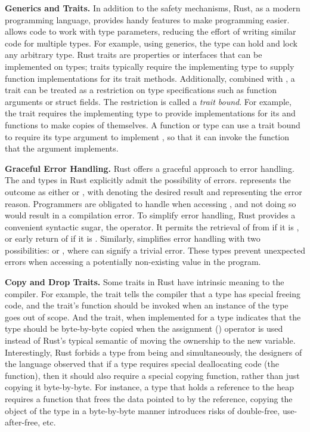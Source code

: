 \textbf{Generics and Traits.}
In addition to the safety mechanisms, Rust, as a modern programming language,
provides handy features to make programming easier.
 allows code to work with type parameters,
reducing the effort of writing similar code for multiple types.
For example, using generics, the  type can
hold and lock any arbitrary type.
Rust traits are properties or interfaces that can be implemented on types; traits typically require the implementing type
to supply function implementations for its trait methods.
Additionally, combined with ,
a trait can be treated as a restriction on type specifications such as function arguments or struct fields.
The restriction is called a \textit{trait bound}.
For example, the  trait requires the implementing type
to provide implementations for its  and  functions
to make copies of themselves.
A  function or type can use a trait bound to
require its type argument to implement ,
so that it can invoke the  function that the argument implements.

\textbf{Graceful Error Handling.}
Rust offers a graceful approach to error handling.
The  and  types in Rust
explicitly admit the possibility of errors.
 represents the outcome as either  or ,
with  denoting the desired result
and  representing the error reason.
Programmers are obligated to handle  when accessing ,
and not doing so would result in a compilation error.
To simplify error handling,
Rust provides a convenient syntactic sugar,
the  operator.
It permits the retrieval of  from  if it is ,
or early return of  if it is .
Similarly,  simplifies error handling with two possibilities:
 or , where  can signify a trivial error.
These types prevent unexpected errors
when accessing a potentially non-existing value in the program.

\textbf{Copy and Drop Traits.}
Some traits in Rust have intrinsic meaning to the compiler. For example, the
 trait tells the compiler that a type has special freeing code, and
the  trait's  function should be invoked when an instance
of the type goes out of scope. And the  trait, when implemented for
a type indicates that the type should be byte-by-byte copied when the
assignment (\code{=}) operator is used instead of Rust's typical semantic
of moving the ownership to the new variable. Interestingly, Rust forbids a type
from being  and  simultaneously, the designers of the
language observed that if a type requires special deallocating code (the
 function), then it should also require a special copying function,
rather than just copying it byte-by-byte. For instance, a type that holds a
reference to the heap requires a  function that frees the data
pointed to by the reference, copying the object of the type in a byte-by-byte
manner introduces risks of double-free, use-after-free, etc.

